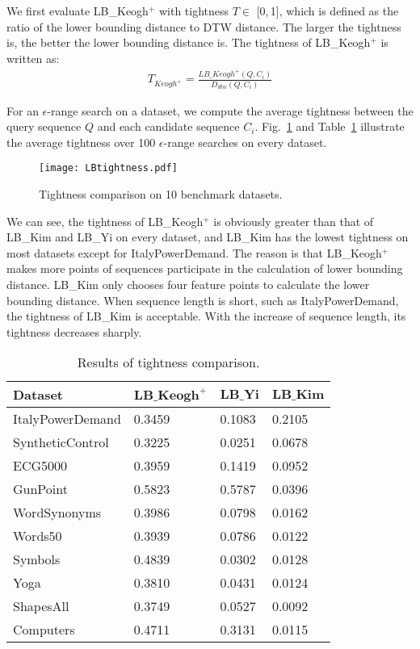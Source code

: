 \documentclass[10pt,journal,compsoc]{IEEEtran}
\begin{document}
We first evaluate LB\_Keogh$^+$ with tightness $T\in$ [0,\,1],
which is defined as the ratio of the lower bounding distance to DTW distance.
The larger the tightness is, the better the lower bounding distance is.
The tightness of LB\_Keogh$^+$ is written as:
\begin{equation}\label{eq:tightness_proposed method}
\begin{split}
	T_{Keogh^+} = \frac{LB\_Keogh^+(Q,C_i)}{D_{dtw}(Q,C_i)}
\end{split}
\end{equation}

For an $\epsilon$-range search on a dataset,
we compute the average tightness between the query sequence $Q$ and each candidate sequence $C_i$.
Fig.~\ref{fig: tightness comparison on benchmark datasets} and Table~\ref{tab:tightness comparison on benchmark datasets}
illustrate the average tightness over 100 $\epsilon$-range searches on every dataset.

\begin{figure}[htbp]
  \centering
  \texttt{[image: LBtightness.pdf]}
  \caption{Tightness comparison on 10 benchmark datasets.}
  \label{fig: tightness comparison on benchmark datasets}
\end{figure}

We can see, the tightness of LB\_Keogh$^+$ is obviously greater than that of LB\_Kim and LB\_Yi on every dataset,
and LB\_Kim has the lowest tightness on most datasets except for ItalyPowerDemand.
The reason is that LB\_Keogh$^+$ makes more points of sequences participate in the calculation of lower bounding distance.
LB\_Kim only chooses four feature points to calculate the lower bounding distance.
When sequence length is short, such as ItalyPowerDemand, the tightness of LB\_Kim is acceptable.
With the increase of sequence length, its tightness decreases sharply.

\begin{table}[H]
\centering
\caption{Results of tightness comparison.}\label{tab:tightness comparison on benchmark datasets}
\begin{tabular}{p{2.3cm}p{1.5cm}<{\centering}p{1.2cm}<{\centering}p{1.2cm}<{\centering}}
\hline
\textbf{Dataset} & $\textbf{LB\_Keogh}^+$ &	$\textbf{LB\_Yi}$ &	$\textbf{LB\_Kim}$ \\
\hline
    ItalyPowerDemand & 0.3459 & 0.1083 & 0.2105 \\
    SyntheticControl & 0.3225 & 0.0251 & 0.0678 \\
    ECG5000 & 0.3959 & 0.1419 & 0.0952 \\
    GunPoint & 0.5823 & 0.5787 & 0.0396 \\
    WordSynonyms   & 0.3986 & 0.0798 & 0.0162 \\
    Words50 & 0.3939 & 0.0786 & 0.0122 \\
    Symbols & 0.4839 & 0.0302 & 0.0128 \\
    Yoga  & 0.3810 & 0.0431 & 0.0124 \\
    ShapesAll & 0.3749 & 0.0527 & 0.0092 \\
    Computers & 0.4711 & 0.3131 & 0.0115 \\
\hline
\end{tabular}
\end{table}
\end{document}
